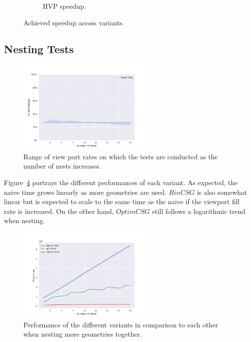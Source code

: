 \documentclass[a4paper,11pt,oneside]{article}
\begin{document}
\begin{figure}[H]
\begin{subfigure}[b]{0.6\textwidth}
		\caption{HVP speedup.}
		\label{sec5:speedup-hvp}
	\end{subfigure}
	\hfill
	\caption{Achieved speedup across variants.}
	\label{sec5:speedup}
\end{figure}

\subsection{Nesting Tests}


\begin{figure}[H]
	\centering
	\includegraphics[width=0.6\textwidth]{section5/plots/test_nesting_rates.png}
	\caption{Range of view port rates on which the tests are conducted as the number of nests increases.}
	\label{sec5.2:test_nesting_rates}
\end{figure}


Figure~\ref{sec5.2:test_nesting} portrays the different performances of each variant. As expected, the naive time grows linearly as more geometries are used. $BinCSG$ is also somewhat linear but is expected to scale to the same time as the naive if the viewport fill rate is increased. On the other hand, $OptimCSG$ still follows a logarithmic trend when nesting.

\begin{figure}[H]
	\centering
	\includegraphics[width=0.6\textwidth]{section5/plots/test_nesting.png}
	\caption{Performance of the different variants in comparison to each other when nesting more geometries together.}
	\label{sec5.2:test_nesting}
\end{figure}
\end{document}

